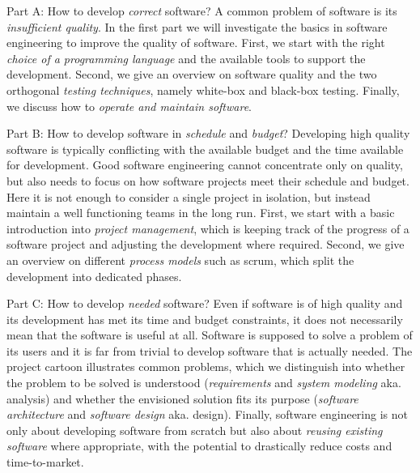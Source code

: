 \begin{frame}{\myframetitle{}}
	\small
	\begin{fancycolumns}[columns=3,t,widths={26,34,38}]
		\begin{definition}{Part A: How to develop \emph{correct} software?}
			A common problem of software is its \emph{insufficient quality}. In the first part we will investigate the basics in software engineering to improve the quality of software. First, we start with the right \emph{choice of a programming language} and the available tools to support the development. Second, we give an overview on software quality and the two orthogonal \emph{testing techniques}, namely white-box and black-box testing. %
			Finally, we discuss how to \emph{operate and maintain software}.
		\end{definition}
	\nextcolumn
		\begin{definition}{Part B: How to develop software in \emph{schedule} and \emph{budget}?}
			Developing high quality software is typically conflicting with the available budget and the time available for development. Good software engineering cannot concentrate only on quality, but also needs to focus on how software projects meet their schedule and budget. Here it is not enough to consider a single project in isolation, but instead maintain a well functioning teams in the long run. First, we start with a basic introduction into \emph{project management}, which is keeping track of the progress of a software project and adjusting the development where required. Second, we give an overview on different \emph{process models} such as scrum, which split the development into dedicated phases.
		\end{definition}
	\nextcolumn
		\begin{definition}{Part C: How to develop \emph{needed} software?}
			Even if software is of high quality and its development has met its time and budget constraints, it does not necessarily mean that the software is useful at all. Software is supposed to solve a problem of its users and it is far from trivial to develop software that is actually needed. The project cartoon illustrates common problems, which we distinguish into whether the problem to be solved is understood (\emph{requirements} and \emph{system modeling} aka. analysis) and whether the envisioned solution fits its purpose (\emph{software architecture} and \emph{software design} aka. design). Finally, software engineering is not only about developing software from scratch but also about \emph{reusing existing software} where appropriate, with the potential to drastically reduce costs and time-to-market.
		\end{definition}
	\end{fancycolumns}
\end{frame}

